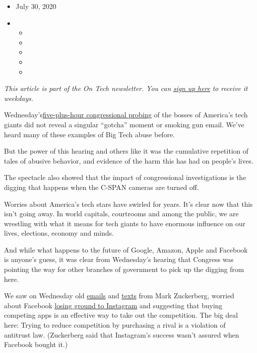 \begin{itemize}
\item
  July 30, 2020
\item
  \begin{itemize}
  \item
  \item
  \item
  \item
  \item
  \end{itemize}
\end{itemize}

\emph{This article is part of the On Tech newsletter. You can}
\href{https://www.nytimes3xbfgragh.onion/newsletters/signup/OT}{\emph{sign
up here}} \emph{to receive it weekdays.}

Wednesday's\href{https://www.nytimes3xbfgragh.onion/2020/07/29/technology/big-tech-hearing-apple-amazon-facebook-google.html}{five-plus-hour
congressional probing} of the bosses of America's tech giants did not
reveal a singular ``gotcha'' moment or smoking gun email. We've heard
many of these examples of Big Tech abuse before.

But the power of this hearing and others like it was the cumulative
repetition of tales of abusive behavior, and evidence of the harm this
has had on people's lives.

The spectacle also showed that the impact of congressional
investigations is the digging that happens when the C-SPAN cameras are
turned off.

Worries about America's tech stars have swirled for years. It's clear
now that this isn't going away. In world capitals, courtrooms and among
the public, we are wrestling with what it means for tech giants to have
enormous influence on our lives, elections, economy and minds.

And while what happens to the future of Google, Amazon, Apple and
Facebook is anyone's guess, it was clear from Wednesday's hearing that
Congress was pointing the way for other branches of government to pick
up the digging from here.

We saw on Wednesday old
\href{https://judiciary.house.gov/uploadedfiles/0002.pdf}{emails} and
\href{https://judiciary.house.gov/uploadedfiles/0006336700063372.pdf}{texts}
from Mark Zuckerberg, worried about Facebook
\href{https://www.nytimes3xbfgragh.onion/live/2020/07/29/technology/tech-ceos-hearing-testimony/lawmakers-said-documents-show-facebook-tried-to-neutralize-a-competitive-threat}{losing
ground to Instagram} and suggesting that buying competing apps is an
effective way to take out the competition. The big deal here: Trying to
reduce competition by purchasing a rival is a violation of antitrust
law. (Zuckerberg said that Instagram's success wasn't assured when
Facebook bought it.)

